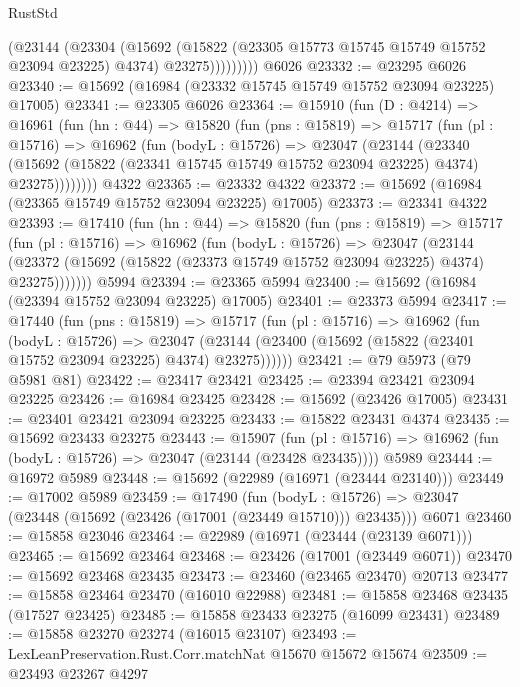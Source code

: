 \begin{lexlean}{RustStd}
\begin{coremodule}
                (@23144
                  (@23304
                    (@15692
                      (@15822 (@23305 @15773 @15745 @15749 @15752 @23094 @23225) @4374)
                      @23275)))))))))
    @6026
@23332 := @23295 @6026
@23340 := @15692 (@16984 (@23332 @15745 @15749 @15752 @23094 @23225) @17005)
@23341 := @23305 @6026
@23364 := @15910
    (fun (D : @4214) =>
    @16961
      (fun (hn : @44) =>
      @15820
        (fun (pns : @15819) =>
        @15717
          (fun (pl : @15716) =>
          @16962
            (fun (bodyL : @15726) =>
            @23047
              (@23144
                (@23340
                  (@15692 (@15822 (@23341 @15745 @15749 @15752 @23094 @23225) @4374) @23275))))))))
    @4322
@23365 := @23332 @4322
@23372 := @15692 (@16984 (@23365 @15749 @15752 @23094 @23225) @17005)
@23373 := @23341 @4322
@23393 := @17410
    (fun (hn : @44) =>
    @15820
      (fun (pns : @15819) =>
      @15717
        (fun (pl : @15716) =>
        @16962
          (fun (bodyL : @15726) =>
          @23047
            (@23144
              (@23372 (@15692 (@15822 (@23373 @15749 @15752 @23094 @23225) @4374) @23275)))))))
    @5994
@23394 := @23365 @5994
@23400 := @15692 (@16984 (@23394 @15752 @23094 @23225) @17005)
@23401 := @23373 @5994
@23417 := @17440
    (fun (pns : @15819) =>
    @15717
      (fun (pl : @15716) =>
      @16962
        (fun (bodyL : @15726) =>
        @23047 (@23144 (@23400 (@15692 (@15822 (@23401 @15752 @23094 @23225) @4374) @23275))))))
@23421 := @79 @5973 (@79 @5981 @81)
@23422 := @23417 @23421
@23425 := @23394 @23421 @23094 @23225
@23426 := @16984 @23425
@23428 := @15692 (@23426 @17005)
@23431 := @23401 @23421 @23094 @23225
@23433 := @15822 @23431 @4374
@23435 := @15692 @23433 @23275
@23443 := @15907
    (fun (pl : @15716) => @16962 (fun (bodyL : @15726) => @23047 (@23144 (@23428 @23435))))
    @5989
@23444 := @16972 @5989
@23448 := @15692 (@22989 (@16971 (@23444 @23140)))
@23449 := @17002 @5989
@23459 := @17490
    (fun (bodyL : @15726) => @23047 (@23448 (@15692 (@23426 (@17001 (@23449 @15710))) @23435)))
    @6071
@23460 := @15858 @23046
@23464 := @22989 (@16971 (@23444 (@23139 @6071)))
@23465 := @15692 @23464
@23468 := @23426 (@17001 (@23449 @6071))
@23470 := @15692 @23468 @23435
@23473 := @23460 (@23465 @23470) @20713
@23477 := @15858 @23464 @23470 (@16010 @22988)
@23481 := @15858 @23468 @23435 (@17527 @23425)
@23485 := @15858 @23433 @23275 (@16099 @23431)
@23489 := @15858 @23270 @23274 (@16015 @23107)
@23493 := LexLeanPreservation.Rust.Corr.matchNat @15670 @15672 @15674
@23509 := @23493
    @23267
    @4297

\end{coremodule}
\end{lexlean}
